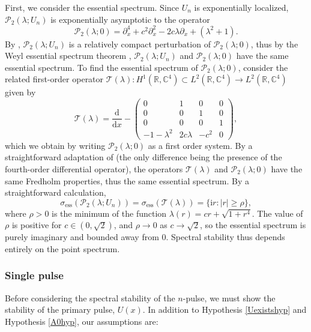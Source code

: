 \documentclass[review,onefignum,onetabnum]{siamart171218}
\newcommand{\C}{\mathbb{C}}
\newcommand{\R}{\mathbb{R}}
\newcommand{\rmd}{\mathrm{d}}
\newcommand{\rmi}{\mathrm{i}}
\newcommand{\calP}{\mathcal{P}}
\newcommand{\calT}{\mathcal{T}}
\begin{document}
First, we consider the essential spectrum. Since $U_n$ is exponentially localized, $\calP_2(\lambda; U_n)$ is exponentially asymptotic to the operator
\begin{equation}\label{quadeig0}
\calP_2(\lambda; 0) = \partial_x^4 + c^2 \partial_x^2 - 2 c \lambda \partial_x + (\lambda^2 + 1).
\end{equation}
By \cite[Theorem~3.1.11]{kapitula:sad13}, $\calP_2(\lambda; U_n)$ is a relatively compact perturbation of $\calP_2(\lambda; 0)$, thus by the Weyl essential spectrum theorem \cite[Theorem~2.2.6]{kapitula:sad13}, $\calP_2(\lambda; U_n)$ and $\calP_2(\lambda; 0)$ have the same essential spectrum. To find the essential spectrum of $\calP_2(\lambda; 0)$, consider the related first-order operator $\calT(\lambda): H^1(\R, \C^4) \subset L^2(\R,\C^4) \rightarrow L^2(\R,\C^4)$ given by
\begin{equation}
\calT(\lambda) = \frac{\rmd}{\rmd x} - \begin{pmatrix}
0 & 1 & 0 & 0 \\
0 & 0 & 1 & 0 \\
0 & 0 & 0 & 1 \\
-1 - \lambda^2 & 2 c \lambda & -c^2 & 0
\end{pmatrix},
\end{equation}
which we obtain by writing $\calP_2(\lambda; 0)$ as a first order system. By a straightforward adaptation of \cite[Theorem A.1]{sandstede:rmi08} (the only difference being the presence of the fourth-order differential operator), the operators $\calT(\lambda)$ and $\calP_2(\lambda; 0)$ have the same Fredholm properties, thus the same essential spectrum. By a straightforward calculation,
\begin{equation}\label{quadess}
\sigma_{\mathrm{ess}}(\calP_2(\lambda; U_n)) = \sigma_{\mathrm{ess}}(\calT(\lambda)) = \{\rmi r : |r| \geq \rho \},
\end{equation}
where $\rho > 0$ is the minimum of the function $\lambda(r) = c r + \sqrt{1 + r^4}$. The value of $\rho$ is positive for $c \in (0, \sqrt{2})$, and $\rho\to0$ as $c\to\sqrt{2}$, so the essential spectrum is purely imaginary and bounded away from 0. Spectral stability thus depends entirely on the point spectrum.

\subsubsection{Single pulse}

Before considering the spectral stability of the $n$-pulse, we must show the stability of the primary pulse, $U(x)$. In addition to Hypothesis \ref{Uexistshyp} and Hypothesis \ref{A0hyp}, our assumptions are:
\end{document}
